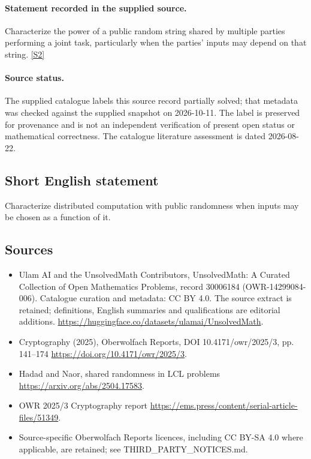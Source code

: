 \documentclass[11pt]{article}
\begin{document}
\paragraph{Statement recorded in the supplied source.}
Characterize the power of a public random string shared by multiple parties performing a joint task, particularly when the parties' inputs may depend on that string. \href{https://doi.org/10.4171/owr/2025/3}{[S2]}
\paragraph{Source status.}
The supplied catalogue labels this source record partially solved; that metadata was checked against the supplied snapshot on 2026-10-11. The label is preserved for provenance and is not an independent verification of present open status or mathematical correctness. The catalogue literature assessment is dated 2026-08-22.
\subsection{Short English statement}
Characterize distributed computation with public randomness when inputs may be chosen as a function of it.
\subsection{Sources}
\begin{itemize}
\item[S1] Ulam AI and the UnsolvedMath Contributors, UnsolvedMath: A Curated Collection of Open Mathematics Problems, record 30006184 (OWR-14299084-006). Catalogue curation and metadata: CC BY 4.0. The source extract is retained; definitions, English summaries and qualifications are editorial additions.
\url{https://huggingface.co/datasets/ulamai/UnsolvedMath}.
\item[S2] Cryptography (2025), Oberwolfach Reports, DOI 10.4171/owr/2025/3, pp. 141--174
\url{https://doi.org/10.4171/owr/2025/3}.
\item[S3] Hadad and Naor, shared randomness in LCL problems
\url{https://arxiv.org/abs/2504.17583}.
\item[S4] OWR 2025/3 Cryptography report
\url{https://ems.press/content/serial-article-files/51349}.
\item Source-specific Oberwolfach Reports licences, including CC BY-SA 4.0 where applicable, are retained; see THIRD\_PARTY\_NOTICES.md.
\end{itemize}
\end{document}

